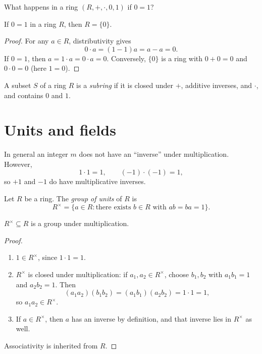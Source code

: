 \documentclass[reqno,11pt]{amsart}
\begin{document}
What happens in a ring $(R,+,\cdot,0,1)$ if $0=1$?

\begin{proposition}\label{prop:zero-ring}
If $0=1$ in a ring $R$, then $R=\{0\}$.
\end{proposition}
\begin{proof}
For any $a\in R$, distributivity gives
\[
  0\cdot a=(1-1)a=a-a=0.
\]
If $0=1$, then $a=1\cdot a=0\cdot a=0$.
Conversely, $\{0\}$ is a ring with $0+0=0$ and $0\cdot0=0$
(here $1=0$).
\end{proof}

\begin{define}[Subring]
A subset $S$ of a ring $R$ is a \emph{subring} if it is closed under
$+$, additive inverses, and $\cdot$, and contains $0$ and $1$.
\end{define}

\section{Units and fields}

In general an integer $m$ does not have an ``inverse'' under
multiplication. However,
\[
  1\cdot1=1,\qquad (-1)\cdot(-1)=1,
\]
so $+1$ and $-1$ do have multiplicative inverses.

\begin{define}
Let $R$ be a ring. The \emph{group of units} of $R$ is
\[
  R^\times=\{a\in R:\text{there exists } b\in R\text{ with }
  ab=ba=1\}.
\]
\end{define}

\begin{proposition}\label{prop:units-group}
$R^\times\subseteq R$ is a group under multiplication.
\end{proposition}
\begin{proof}
\begin{enumerate}[label=(\arabic*)]
  \item $1\in R^\times$, since $1\cdot1=1$.
  \item $R^\times$ is closed under multiplication: if
    $a_1,a_2\in R^\times$, choose $b_1,b_2$ with $a_1b_1=1$ and
    $a_2b_2=1$. Then
    \[
      (a_1a_2)(b_1b_2)=(a_1b_1)(a_2b_2)=1\cdot1=1,
    \]
    so $a_1a_2\in R^\times$.
  \item If $a\in R^\times$, then $a$ has an inverse by definition,
    and that inverse lies in $R^\times$ as well.
\end{enumerate}
Associativity is inherited from $R$.
\end{proof}
\end{document}

